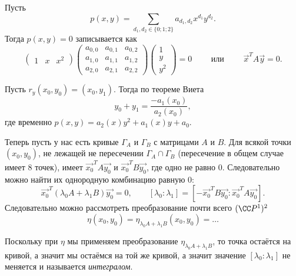 \documentclass[12pt,a4paper]{article}
\begin{document}
    \begin{definition}
        Пусть
        \[p(x, y) = \sum_{d_1, d_2 \in \{0; 1; 2\}} a_{d_1, d_2} x^{d_1} y^{d_2}.\]
        Тогда $p(x, y) = 0$ записывается как
        \[
            \begin{pmatrix}
                1& x& x^2
            \end{pmatrix}
            \begin{pmatrix}
                a_{0,0}& a_{0, 1}& a_{0, 2}\\
                a_{1,0}& a_{1, 1}& a_{1, 2}\\
                a_{2,0}& a_{2, 1}& a_{2, 2}
            \end{pmatrix}
            \begin{pmatrix}
                1\\
                y\\
                y^2
            \end{pmatrix}
            = 0
            \qquad \text{ или } \qquad
            \vec{x}^T A \vec{y} = 0.
        \]
    \end{definition}
    
    \begin{remark}
        Пусть $r_y(x_0, y_0) = (x_0, y_1)$. Тогда по теореме Виета
        \[y_0 + y_1 = \frac{-a_1(x_0)}{a_2(x_0)},\]
        где временно $p(x, y) = a_2(x) y^2 + a_1(x) y + a_0$.
    \end{remark}

    \begin{definition}
        Теперь пусть у нас есть кривые $\Gamma_A$ и $\Gamma_B$ с матрицами $A$ и $B$. Для всякой точки $(x_0, y_0)$, не лежащей не пересечении $\Gamma_A \cap \Gamma_B$ (пересечение в общем случае имеет 8 точек), имеет $\vec{x_0}^T A \vec{y_0}$ и $\vec{x_0}^T B \vec{y_0}$, где одно не равно $0$. Следовательно можно найти их однородную комбинацию равную $0$:
        \[\vec{x_0}^T (\lambda_0 A + \lambda_1 B) \vec{y_0} = 0, \qquad [\lambda_0: \lambda_1] = [- \vec{x_0}^T B \vec{y_0}: \vec{x_0}^T A \vec{y_0}].\]
        Следовательно можно рассмотреть преобразование почти всего $(\CC P^1)^2$
        \[
            \eta(x_0, y_0)
            = \eta_{\lambda_0 A + \lambda_1 B}(x_0, y_0)
            = \dots
        \]
    \end{definition}

    \begin{remark}
        Поскольку при $\eta$ мы применяем преобразование $\eta_{\lambda_0 A + \lambda_1 B}$, то точка остаётся на кривой, а значит мы остаёмся на той же кривой, а значит значение $[\lambda_0: \lambda_1]$ не меняется и называется \emph{интегралом}.
    \end{remark}
\end{document}
